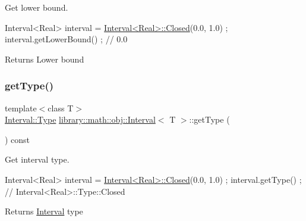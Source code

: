 Get lower bound. 


\begin{DoxyCode}
Interval<Real> interval = \hyperlink{classlibrary_1_1math_1_1obj_1_1_interval_aae8bb2b89af450729338d48563def4d7}{Interval<Real>::Closed}(0.0, 1.0) ;
interval.getLowerBound() ; \textcolor{comment}{// 0.0}
\end{DoxyCode}


\begin{DoxyReturn}{Returns}
Lower bound 
\end{DoxyReturn}
\mbox{\label{classlibrary_1_1math_1_1obj_1_1_interval_a881ab7e17883b4f1553d7e8ba9cc7656}} 
\subsubsection{\texorpdfstring{get\+Type()}{getType()}}
{\footnotesize\ttfamily template$<$class T$>$ \\
\hyperlink{classlibrary_1_1math_1_1obj_1_1_interval_base_aabce6fa07a6e2e8fd3fcab5fd0d317d6}{Interval\+::\+Type} \hyperlink{classlibrary_1_1math_1_1obj_1_1_interval}{library\+::math\+::obj\+::\+Interval}$<$ T $>$\+::get\+Type (\begin{DoxyParamCaption}{ }\end{DoxyParamCaption}) const}



Get interval type. 


\begin{DoxyCode}
Interval<Real> interval = \hyperlink{classlibrary_1_1math_1_1obj_1_1_interval_aae8bb2b89af450729338d48563def4d7}{Interval<Real>::Closed}(0.0, 1.0) ;
interval.getType() ; \textcolor{comment}{// Interval<Real>::Type::Closed}
\end{DoxyCode}


\begin{DoxyReturn}{Returns}
\hyperlink{classlibrary_1_1math_1_1obj_1_1_interval}{Interval} type 
\end{DoxyReturn}
\mbox{\label{classlibrary_1_1math_1_1obj_1_1_interval_a4183db388b6a63429a031d3687b20ecf}} 
